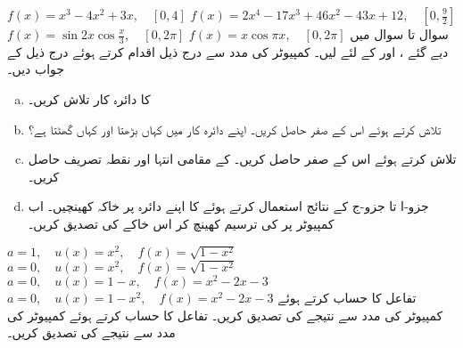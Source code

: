 $f(x)=x^3-4x^2+3x,\quad [0,4]$
$f(x)=2x^4-17x^3+46x^2-43x+12,\quad [0,\tfrac{9}{2}]$
$f(x)=\sin2x\cos\tfrac{x}{3},\quad [0,2\pi]$
$f(x)=x\cos \pi x,\quad [0,2\pi]$
سوال  تا سوال  میں دیے گئے ،  اور  کے لئے  لیں۔ کمپیوٹر کی مدد سے درج ذیل اقدام کرتے ہوئے درج ذیل کے جواب دیں۔
\begin{enumerate}[a.]
\item
{} کا دائرہ کار تلاش کریں۔
\item
{} تلاش کرتے ہوئے اس کے صفر حاصل کریں۔ اپنے دائرہ کار میں کہاں  بڑھتا اور کہاں گھٹتا ہے؟
\item
{} تلاش کرتے ہوئے اس کے صفر حاصل کریں۔ کے مقامی انتہا اور نقطہ تصریف حاصل کریں۔
\item
جزو-ا تا جزو-ج کے نتائج استعمال کرتے ہوئے  کا اپنے دائرہ پر خاکہ کھینچیں۔ اب کمپیوٹر پر  کی ترسیم کھینچ کر اس خاکے کی تصدیق کریں۔
\end{enumerate}
$a=1,\quad u(x)=x^2,\quad f(x)=\sqrt{1-x^2}$
$a=0,\quad u(x)=x^2,\quad f(x)=\sqrt{1-x^2}$
$a=0,\quad u(x)=1-x,\quad f(x)=x^2-2x-3$
$a=0,\quad u(x)=1-x^2,\quad f(x)=x^2-2x-3$
تفاعل  کا حساب کرتے ہوئے کمپیوٹر کی مدد سے نتیجے کی تصدیق کریں۔
تفاعل  کا حساب کرتے ہوئے کمپیوٹر کی مدد سے نتیجے کی تصدیق کریں۔

